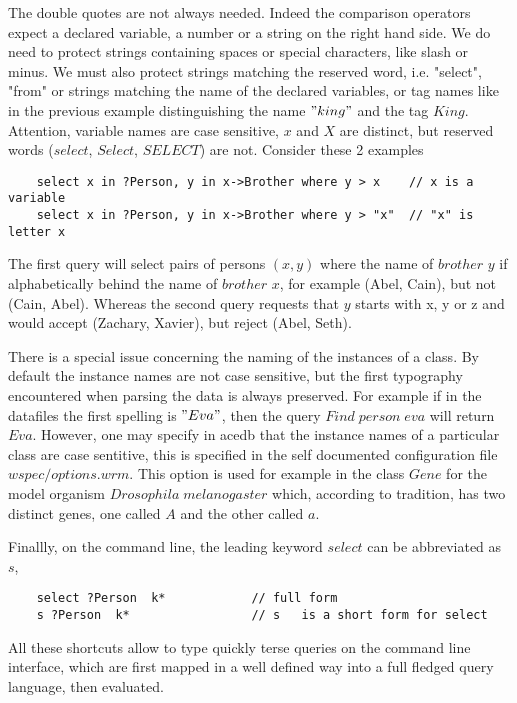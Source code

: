 \documentclass[11pt]{article}
\newcommand{\BL}{\begin{lstlisting}}
\begin{document}
The double quotes are not always needed. Indeed the comparison operators
expect a declared variable, a number or a string on the right hand side. We do need to protect 
strings containing spaces or special characters, like slash or minus. We must also protect 
strings matching the reserved word, i.e. "select", "from"  or strings  matching the name of 
the declared variables, or tag names like in the previous example distinguishing
 the name $"king"$ and the tag $King$. 
Attention, variable names are case sensitive, $x$ and $X$ are distinct, 
but reserved words ($select$, $Select$, $SELECT$) are not. Consider these 2 examples
\BL
    select x in ?Person, y in x->Brother where y > x    // x is a variable
    select x in ?Person, y in x->Brother where y > "x"  // "x" is letter x
\end{lstlisting}
The first query will select pairs of persons $(x, y)$ where the name of $brother$ $y$
if alphabetically behind the name of $brother$ $x$, for example (Abel, Cain), but
not (Cain, Abel). Whereas the second query requests that $y$ starts with x, y or z
and would accept (Zachary, Xavier), but reject (Abel, Seth).

There is a special issue concerning the naming of the instances of a class. By default
the instance names are not case sensitive, but the first typography encountered when parsing
the data is always preserved. For example if in the datafiles the first spelling is $"Eva"$, then
the query $Find\; person\; eva$ will return $Eva$. However, one may specify in acedb that the
instance names of a particular class are case sentitive, this is specified in the
self documented configuration file $wspec/options.wrm$. This option is used for example
in the class $Gene$ for the model organism $Drosophila\;melanogaster$ which, according
to tradition, has two distinct genes, one called $A$ and the other called $a$.


Finallly, on the command line, the leading keyword $select$ can be abbreviated as $s$,
\BL
    select ?Person  k*            // full form
    s ?Person  k*                 // s   is a short form for select
\end{lstlisting}

All these shortcuts allow to type quickly terse queries on the command line interface, 
which are first mapped in a well defined way into a full fledged query language,
then evaluated.


\end{document}
